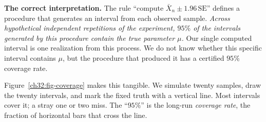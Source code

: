 \begin{focusbox}
\textbf{The correct interpretation.} The rule ``compute $\bar X_n \pm 1.96\,\mathrm{SE}$'' defines
a procedure that generates an interval from each observed sample. \emph{Across hypothetical independent
repetitions of the experiment, $95\%$ of the intervals generated by this procedure contain the true parameter $\mu$.}
Our single computed interval is one realization from this process. We do not know whether this specific interval
contains $\mu$, but the procedure that produced it has a certified $95\%$ coverage rate.
\end{focusbox}

Figure~\ref{ch32:fig-coverage} makes this tangible. We simulate twenty samples, draw the
twenty intervals, and mark the fixed truth with a vertical line. Most intervals cover
it; a stray one or two miss. The ``$95\%$'' is the long-run \emph{coverage rate}, the
fraction of horizontal bars that cross the line.

